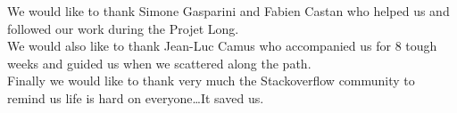 We would like to thank Simone Gasparini and Fabien Castan
who helped us and followed our work during the Projet Long.\\

\noindent
We would also like to thank Jean-Luc Camus who accompanied us
for 8 tough weeks and guided us when we scattered along the path.\\

\noindent
Finally we would like to thank very much the Stackoverflow community to remind us life is hard on everyone\ldots \quad It saved us.

